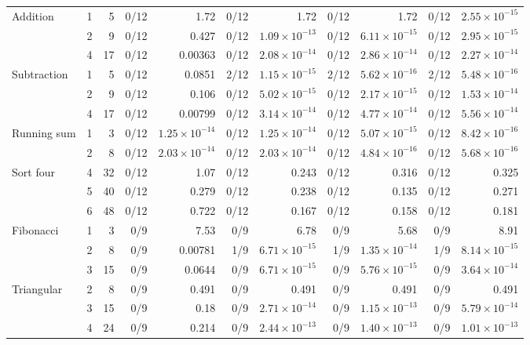 \begin{table}[htbp]
{\begin{tabular}{@{}lrr *{8}{r}@{}}
Addition & 1 & 5 & 0/12 & 1.72 & 0/12 & 1.72 & 0/12 & 1.72 & 0/12 & $2.55\!\times\!10^{-15}$ \\
 & 2 & 9 & 0/12 & 0.427 & 0/12 & $1.09\!\times\!10^{-13}$ & 0/12 & $6.11\!\times\!10^{-15}$ & 0/12 & $2.95\!\times\!10^{-15}$ \\
 & 4 & 17 & 0/12 & 0.00363 & 0/12 & $2.08\!\times\!10^{-14}$ & 0/12 & $2.86\!\times\!10^{-14}$ & 0/12 & $2.27\!\times\!10^{-14}$ \\
Subtraction & 1 & 5 & 0/12 & 0.0851 & 2/12 & $1.15\!\times\!10^{-15}$ & 2/12 & $5.62\!\times\!10^{-16}$ & 2/12 & $5.48\!\times\!10^{-16}$ \\
 & 2 & 9 & 0/12 & 0.106 & 0/12 & $5.02\!\times\!10^{-15}$ & 0/12 & $2.17\!\times\!10^{-15}$ & 0/12 & $1.53\!\times\!10^{-14}$ \\
 & 4 & 17 & 0/12 & 0.00799 & 0/12 & $3.14\!\times\!10^{-14}$ & 0/12 & $4.77\!\times\!10^{-14}$ & 0/12 & $5.56\!\times\!10^{-14}$ \\
Running sum & 1 & 3 & 0/12 & $1.25\!\times\!10^{-14}$ & 0/12 & $1.25\!\times\!10^{-14}$ & 0/12 & $5.07\!\times\!10^{-15}$ & 0/12 & $8.42\!\times\!10^{-16}$ \\
 & 2 & 8 & 0/12 & $2.03\!\times\!10^{-14}$ & 0/12 & $2.03\!\times\!10^{-14}$ & 0/12 & $4.84\!\times\!10^{-16}$ & 0/12 & $5.68\!\times\!10^{-16}$ \\
Sort four & 4 & 32 & 0/12 & 1.07 & 0/12 & 0.243 & 0/12 & 0.316 & 0/12 & 0.325 \\
 & 5 & 40 & 0/12 & 0.279 & 0/12 & 0.238 & 0/12 & 0.135 & 0/12 & 0.271 \\
 & 6 & 48 & 0/12 & 0.722 & 0/12 & 0.167 & 0/12 & 0.158 & 0/12 & 0.181 \\
Fibonacci & 1 & 3 & 0/9 & 7.53 & 0/9 & 6.78 & 0/9 & 5.68 & 0/9 & 8.91 \\
 & 2 & 8 & 0/9 & 0.00781 & 1/9 & $6.71\!\times\!10^{-15}$ & 1/9 & $1.35\!\times\!10^{-14}$ & 1/9 & $8.14\!\times\!10^{-15}$ \\
 & 3 & 15 & 0/9 & 0.0644 & 0/9 & $6.71\!\times\!10^{-15}$ & 0/9 & $5.76\!\times\!10^{-15}$ & 0/9 & $3.64\!\times\!10^{-14}$ \\
Triangular & 2 & 8 & 0/9 & 0.491 & 0/9 & 0.491 & 0/9 & 0.491 & 0/9 & 0.491 \\
 & 3 & 15 & 0/9 & 0.18 & 0/9 & $2.71\!\times\!10^{-14}$ & 0/9 & $1.15\!\times\!10^{-13}$ & 0/9 & $5.79\!\times\!10^{-14}$ \\
 & 4 & 24 & 0/9 & 0.214 & 0/9 & $2.44\!\times\!10^{-13}$ & 0/9 & $1.40\!\times\!10^{-13}$ & 0/9 & $1.01\!\times\!10^{-13}$ \\
\bottomrule
\end{tabular}}
\end{table}
